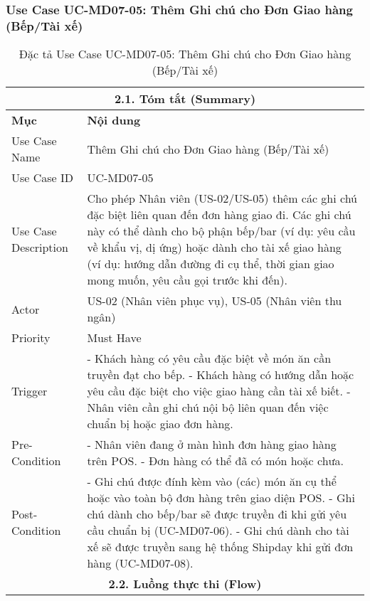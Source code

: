\subsubsection{Use Case UC-MD07-05: Thêm Ghi chú cho Đơn Giao hàng (Bếp/Tài xế)}
\begin{longtable}{|m{4cm}|p{11cm}|}
\caption{Đặc tả Use Case UC-MD07-05: Thêm Ghi chú cho Đơn Giao hàng (Bếp/Tài xế)} \label{tab:uc_md07_05_final_full} \\
\hline
\multicolumn{2}{|c|}{\textbf{2.1. Tóm tắt (Summary)}} \\
\hline
\textbf{Mục} & \textbf{Nội dung} \\
\hline
\endhead %
\hline
\endfoot %
\hline
\endlastfoot %
Use Case Name & Thêm Ghi chú cho Đơn Giao hàng (Bếp/Tài xế) \\
\hline
Use Case ID & UC-MD07-05 \\
\hline
Use Case Description & Cho phép Nhân viên (US-02/US-05) thêm các ghi chú đặc biệt liên quan đến đơn hàng giao đi. Các ghi chú này có thể dành cho bộ phận bếp/bar (ví dụ: yêu cầu về khẩu vị, dị ứng) hoặc dành cho tài xế giao hàng (ví dụ: hướng dẫn đường đi cụ thể, thời gian giao mong muốn, yêu cầu gọi trước khi đến). \\
\hline
Actor & US-02 (Nhân viên phục vụ), US-05 (Nhân viên thu ngân) \\
\hline
Priority & Must Have \\
\hline
Trigger & - Khách hàng có yêu cầu đặc biệt về món ăn cần truyền đạt cho bếp. \newline - Khách hàng có hướng dẫn hoặc yêu cầu đặc biệt cho việc giao hàng cần tài xế biết. \newline - Nhân viên cần ghi chú nội bộ liên quan đến việc chuẩn bị hoặc giao đơn hàng. \\
\hline
Pre-Condition & - Nhân viên đang ở màn hình đơn hàng giao hàng trên POS. \newline - Đơn hàng có thể đã có món hoặc chưa. \\
\hline
Post-Condition & - Ghi chú được đính kèm vào (các) món ăn cụ thể hoặc vào toàn bộ đơn hàng trên giao diện POS. \newline - Ghi chú dành cho bếp/bar sẽ được truyền đi khi gửi yêu cầu chuẩn bị (UC-MD07-06). \newline - Ghi chú dành cho tài xế sẽ được truyền sang hệ thống Shipday khi gửi đơn hàng (UC-MD07-08). \\
\hline
\multicolumn{2}{|c|}{\textbf{2.2. Luồng thực thi (Flow)}} \\

\end{longtable}
